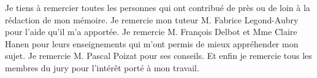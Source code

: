 Je tiens à remercier toutes les personnes qui ont contribué de près ou de loin à la rédaction de mon mémoire. Je remercie mon tuteur M. Fabrice Legond-Aubry pour l'aide qu'il m'a apportée. Je remercie M. François Delbot et Mme Claire Hanen pour leurs enseignements qui m'ont permis de mieux appréhender mon sujet. Je remercie M. Pascal Poizat pour ses conseils. Et enfin je remercie tous les membres du jury pour l'intérêt porté à mon travail.